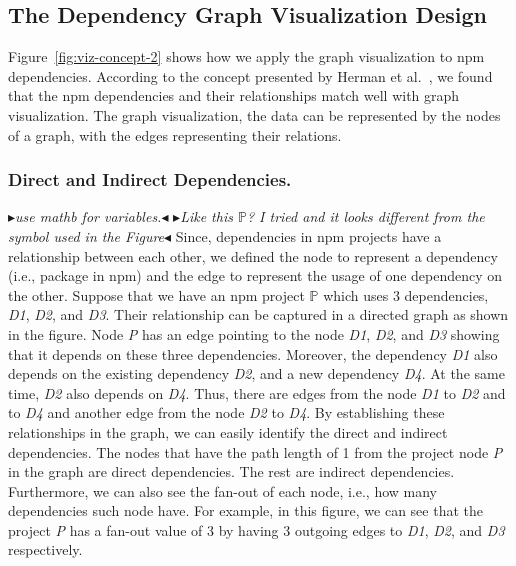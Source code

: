 \documentclass[conference]{IEEEtran}
\newcommand{\boxedtext}[1]{\fbox{\scriptsize\bfseries\textsf{#1}}}
\newcommand{\nota}[2]{
	\boxedtext{#1}
	{\small$\blacktriangleright$\emph{\textsl{#2}}$\blacktriangleleft$}
}
\newcommand{\todo}[1]{{\color{red}\nota{TODO}{#1}}}
\begin{document}
	\subsection{The Dependency Graph Visualization Design}
	Figure~\ref{fig:viz-concept-2} shows how we apply the graph visualization to npm dependencies.
	According to the concept presented by Herman et al.~\cite{Herman2000}, we found that the npm dependencies and their relationships match well with graph visualization. The graph visualization, the data can be represented by the nodes of a graph, with the edges representing their relations.
	
	\subsubsection{Direct and Indirect Dependencies.}
	\todo{use mathb for variables.} \todo{Like this $\mathbb{P}$? I tried and it looks different from the symbol used in the Figure}
	Since, dependencies in npm projects have a relationship between each other, we defined the node to represent a dependency (i.e., package in npm) and the edge to represent the usage of one dependency on the other.  Suppose that we have an npm project $\mathbb{P}$ which uses 3 dependencies, \textit{D1}, \textit{D2}, and \textit{D3}. Their relationship can be captured in a directed graph as shown in the figure. Node \textit{P} has an edge pointing to the node \textit{D1}, \textit{D2}, and \textit{D3} showing that it depends on these three dependencies. Moreover, the dependency \textit{D1} also depends on the existing dependency \textit{D2}, and a new dependency \textit{D4}. At the same time, \textit{D2} also depends on \textit{D4}. Thus, there are edges from the node \textit{D1} to \textit{D2} and to \textit{D4} and another edge from the node \textit{D2} to \textit{D4}. By establishing these relationships in the graph, we can easily identify the direct and indirect dependencies. The nodes that have the path length of 1 from the project node \textit{P} in the graph are direct dependencies. The rest are indirect dependencies. Furthermore, we can also see the fan-out of each node, i.e., how many dependencies such node have.  For example, in this figure, we can see that the project \textit{P} has a fan-out value of 3 by having 3 outgoing edges to \textit{D1}, \textit{D2}, and \textit{D3} respectively.
	
\end{document}
